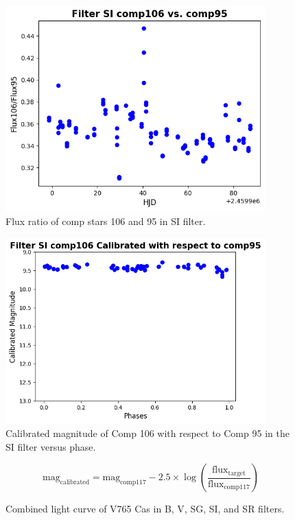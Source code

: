 \documentclass[linenumbers]{aastex631}
\begin{document}
\begin{figure}[H]
\centering
\includegraphics[width=10cm]{Ratio-of-Comps-106-v.-95-SI.png}
\caption{Flux ratio of comp stars 106 and 95 in SI filter.} 
\label{fig:ratiocompssi}
\end{figure}

\begin{figure}[H]
\centering
\includegraphics[width=10cm]{Figures/Comp-106-Calibrated-Mag-SI.png}
\caption{Calibrated magnitude of Comp 106 with respect to Comp 95 in the SI filter versus phase.} 
\label{fig:comp106sicalmag}
\end{figure}

\begin{equation} \label{eqcalmag}
\text {mag} _ {\text {calibrated}} = \text {mag} _ {\text {comp117}} - 2.5 \times \log \left( \frac {\text {flux} _ {\text {target}}} {\text {flux} _ {\text {comp117}}} \right)
\end{equation}

\begin{figure}
\caption{Combined light curve of V765 Cas in B, V, SG, SI, and SR filters.} 
\label{fig:allfilterlightcurve}
\end{figure}
\end{document}
